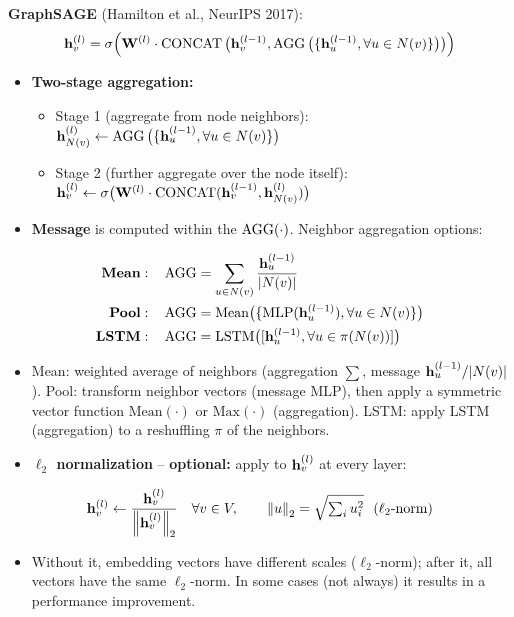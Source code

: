 \textbf{GraphSAGE} (Hamilton et al., NeurIPS 2017):
\begin{equation}\label{eq:lec04-sage}
  \mathbf{h}_v^{(l)} = \sigma\Big(\mathbf{W}^{(l)}\cdot\operatorname{CONCAT}\big(\mathbf{h}_v^{(l-1)},
    \operatorname{AGG}\big(\{\mathbf{h}_u^{(l-1)}, \forall u\in N(v)\}\big)\big)\Big)
\end{equation}
\begin{itemize}
  \item \textbf{Two-stage aggregation:}
    \begin{itemize}
      \item Stage 1 (aggregate from node neighbors):
        $\mathbf{h}_{N(v)}^{(l)} \leftarrow \operatorname{AGG}\big(\{\mathbf{h}_u^{(l-1)}, \forall u\in N(v)\}\big)$
      \item Stage 2 (further aggregate over the node itself):\\
        $\mathbf{h}_v^{(l)} \leftarrow \sigma\big(\mathbf{W}^{(l)}\cdot\operatorname{CONCAT}(\mathbf{h}_v^{(l-1)},\mathbf{h}_{N(v)}^{(l)})\big)$
    \end{itemize}
  \item \textbf{Message} is computed within the $\operatorname{AGG}(\cdot)$. Neighbor
    aggregation options:
\end{itemize}
\begin{align}
  \text{\textbf{Mean}}:\quad & \operatorname{AGG} = \sum_{u\in N(v)} \frac{\mathbf{h}_u^{(l-1)}}{|N(v)|}\\
  \text{\textbf{Pool}}:\quad & \operatorname{AGG} = \mathrm{Mean}\big(\{\mathrm{MLP}(\mathbf{h}_u^{(l-1)}), \forall u\in N(v)\}\big)\\
  \text{\textbf{LSTM}}:\quad & \operatorname{AGG} = \mathrm{LSTM}\big([\mathbf{h}_u^{(l-1)}, \forall u\in \pi(N(v))]\big)
\end{align}
\begin{itemize}
  \item Mean: weighted average of neighbors (aggregation $\sum$, message
    $\mathbf{h}_u^{(l-1)}/|N(v)|$). Pool: transform neighbor vectors (message MLP),
    then apply a symmetric vector function $\mathrm{Mean}(\cdot)$ or
    $\mathrm{Max}(\cdot)$ (aggregation). LSTM: apply LSTM (aggregation) to a
    reshuffling $\pi$ of the neighbors.
  \item \textbf{$\ell_2$ normalization} -- \textbf{optional:} apply to
    $\mathbf{h}_v^{(l)}$ at every layer:
\end{itemize}
\begin{equation}\label{eq:lec04-l2}
  \vh_v^{(l)} \leftarrow \frac{\vh_v^{(l)}}{\norm{\vh_v^{(l)}}_2}\quad\forall v\in V,
  \qquad \norm{u}_2=\sqrt{\textstyle\sum_i u_i^2}\ \ (\ell_2\text{-norm})
\end{equation}
\begin{itemize}
  \item[] Without it, embedding vectors have different scales ($\ell_2$-norm);
    after it, all vectors have the same $\ell_2$-norm. In some cases (not
    always) it results in a performance improvement.
\end{itemize}

